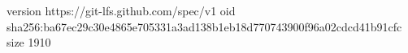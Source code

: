 version https://git-lfs.github.com/spec/v1
oid sha256:ba67ec29c30e4865e705331a3ad138b1eb18d770743900f96a02cdcd41b91cfc
size 1910
